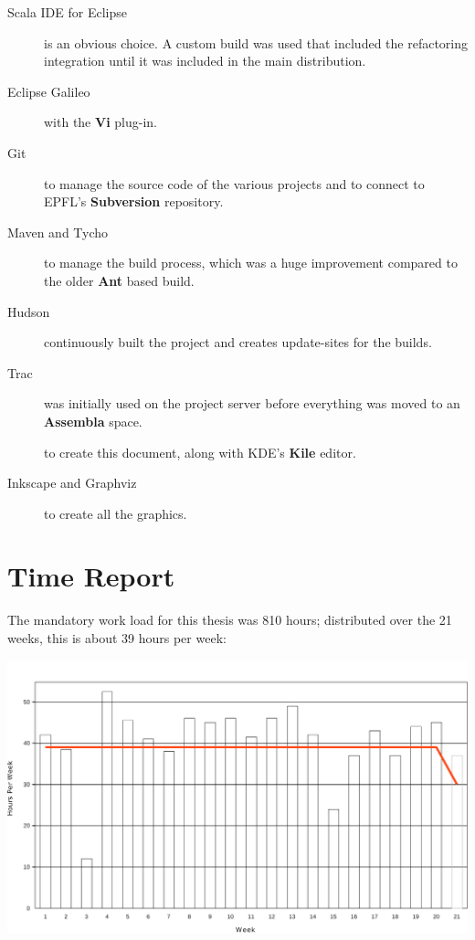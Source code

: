 \documentclass[10pt,a4paper,oneside]{scrreprt}
\begin{document}
\begin{description}
  \item[Scala IDE for Eclipse] is an obvious choice. A custom build was used that included the refactoring integration until it was included in the main distribution.
  \item[Eclipse Galileo] with the \textbf{Vi} plug-in.
  \item[Git] to manage the source code of the various projects and to connect to EPFL's \textbf{Subversion} repository.
  \item[Maven and Tycho] to manage the build process, which was a huge improvement compared to the older \textbf{Ant} based build.
  \item[Hudson] continuously built the project and creates update-sites for the builds.
  \item[Trac] was initially used on the project server before everything was moved to an \textbf{Assembla} space.
  \item[\LaTeXe] to create this document, along with KDE's \textbf{Kile} editor.
  \item[Inkscape and Graphviz] to create all the graphics.
\end{description}

\section{Time Report}

The mandatory work load for this thesis was 810 hours; distributed over the 21 weeks, this is about 39 hours per week:

\begin{center}
  \includegraphics[width=\linewidth]{time.pdf}
\end{center}
\end{document}
